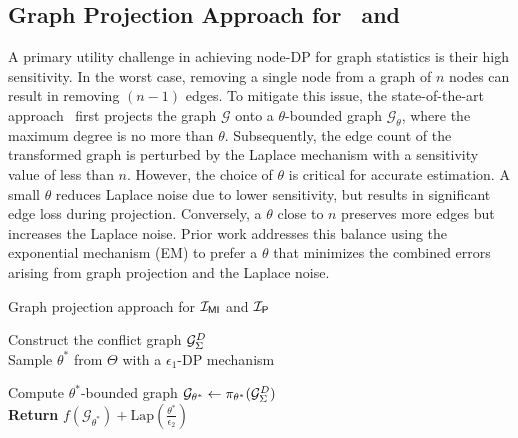 \subsection{Graph Projection Approach for \mininconsistency\ and \problematic} 
A primary utility challenge in achieving node-DP for graph statistics is their high sensitivity. In the worst case, removing a single node from a graph of $n$ nodes can result in removing $(n-1)$ edges. To mitigate this issue, the state-of-the-art approach~\cite{day2016publishing} first projects the graph $\mathcal{G}$ onto a $\theta$-bounded graph $\mathcal{G}_{\theta}$, where the maximum degree is no more than $\theta$. Subsequently, the edge count of the transformed graph is perturbed by the Laplace mechanism with a sensitivity value of less than $n$. However, the choice of $\theta$ is critical for accurate estimation. 
A small $\theta$ reduces Laplace noise due to lower sensitivity, but results in significant edge loss during projection. Conversely, a $\theta$ close to $n$ preserves more edges but increases the Laplace noise. Prior work addresses this balance using the exponential mechanism (EM) to prefer a $\theta$ that minimizes the combined errors arising from graph projection and the Laplace noise. 



\begin{algorithm}[t]
\caption{Graph projection approach for $\mathcal{I_{\mathsf{MI}}}$ and $\mathcal{I_\mathsf{P}}$}
\label{algo:graph_general}
    
    Construct the conflict graph ${\mathcal{G}_{{\Sigma}}^{D}}$\\
    
    Sample $\theta^*$ from $\Theta$  with a $\epsilon_1$-DP mechanism \
    
    Compute $\theta^*$-bounded graph $\mathcal{G}_{\theta^*} \gets \pi_{\theta^*}({\mathcal{G}_{{\Sigma}}^{D}})$  
     \\
    
    {\bf Return} $f(\mathcal{G}_{\theta^*})+\text{Lap}(\frac{\theta^*}{\epsilon_2})$
     \end{algorithm}

